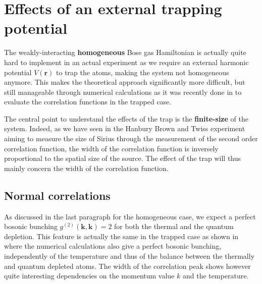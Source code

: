 \section{Effects of an external trapping potential}

\label{sec:width_correlation_theo}
  
The weakly-interacting \textbf{homogeneous} Bose gas Hamiltonian is actually quite hard to implement in an actual experiment as we require an external harmonic potential $V(\bm{r})$ to trap the atoms, making the system not homogeneous anymore. This makes the theoretical approach significantly more difficult, but still manageable through numerical calculations as it was recently done in \cite{butera2020} to evaluate the correlation functions in the trapped case.

The central point to understand the effects of the trap is the \textbf{finite-size} of the system. Indeed, as we have seen in the Hanbury Brown and Twiss experiment aiming to measure the size of Sirius through the measurement of the second order correlation function, the width of the correlation function is inversely proportional to the spatial size of the source. The effect of the trap will thus mainly concern the width of the correlation function.

\subsection{Normal correlations}

\label{sec:width_normal_theo}

As discussed in the last paragraph for the homogeneous case, we expect a perfect bosonic bunching $g^{(2)}(\bm{k},\bm{k})=2$ for both the thermal and the quantum depletion. This feature is actually the same in the trapped case as shown in \cite{butera2020} where the numerical calculations also give a perfect bosonic bunching, independently of the temperature and thus of the balance between the thermally and quantum depleted atoms. The width of the correlation peak shows however quite interesting dependencies on the momentum value $k$ and the temperature.

